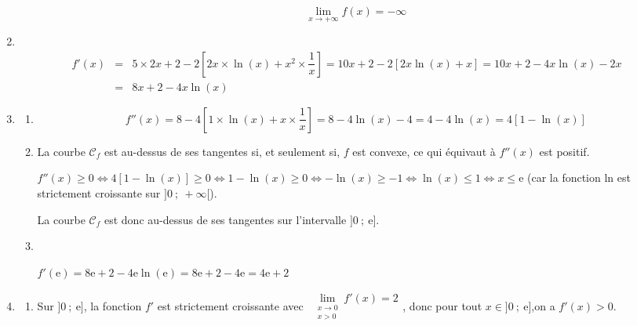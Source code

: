 \begin{enumerate}
\begin{enumerate}
		\[\boxed{\lim_{x \to +\infty}f(x) = -\infty}\]
	\end{enumerate}
	\item\
	\begin{eqnarray*}
		f'(x) &=& 5 \times 2x + 2 - 2 \left[ 2x \times \ln(x) + x^2 \times \dfrac{1}{x}\right] = 10x + 2 - 2\left[2x\ln(x) + x\right] = 10x + 2 - 4x\ln(x) - 2x\\
		&=& \boxed{8x + 2 - 4x\ln(x)}
	\end{eqnarray*}
	\item
	\begin{enumerate}
		\item
		\[f''(x) = 8 - 4\left[1 \times \ln(x) + x \times \dfrac{1}{x}\right] = 8 - 4\ln (x) - 4 = 4 - 4\ln(x) = \boxed{4\left[1-\ln(x)\right]}\]
		\item La courbe $\mathcal{C}_f$ est au-dessus de ses tangentes si, et seulement si, $f$ est convexe, ce qui équivaut à $f''(x)$ est positif.
		
		$f''(x) \geqslant 0 \iff 4\left[1-\ln(x)\right] \geqslant 0 \iff 1-\ln(x) \geqslant 0 \iff -\ln(x) \geqslant -1 \iff \ln(x) \leqslant 1 \iff x \leqslant \text{e}$ (car la fonction ln est strictement croissante sur $]0~;~+\infty[$).\\
		\smallskip
		
		La courbe $\mathcal{C}_f$ est donc au-dessus de ses tangentes sur l'intervalle $]0~;~\text{e}]$.
		\item\
		\begin{center}
		
		$f'(\text{e}) = 8\text{e} + 2 - 4\text{e} \ln(\text{e}) = 8\text{e} + 2 - 4\text{e} = 4\text{e} + 2$
		\end{center}
	\end{enumerate}
	\item
	\begin{enumerate}
		\item Sur $]0~;~\text{e}]$, la fonction $f'$ est strictement croissante avec $\begin{gathered}\lim\limits_{\substack{x \to 0\\x>0}}f'(x) = 2\end{gathered}$, donc pour tout $x \in ]0~;~\text{e}]$,on a $f'(x) > 0$.\\
		\smallskip
		

\end{enumerate}
\end{enumerate}

